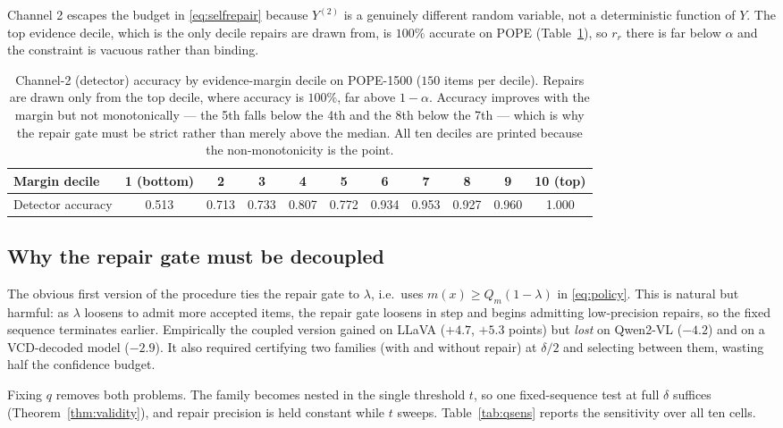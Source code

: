 \documentclass{article}
\theoremstyle{plain}
\theoremstyle{definition}
\theoremstyle{remark}
\begin{document}
Channel 2 escapes the budget in \eqref{eq:selfrepair} because $Y^{(2)}$ is a genuinely
different random variable, not a deterministic function of $Y$. The top evidence decile, which
is the only decile repairs are drawn from, is $100\%$ accurate on POPE
(Table~\ref{tab:channel2}), so $r_r$ there is far below $\alpha$ and the constraint is vacuous
rather than binding.

\begin{table}[t]
\centering
\caption{Channel-2 (detector) accuracy by evidence-margin decile on POPE-1500 ($150$ items per
decile). Repairs are drawn only from the top decile, where accuracy is $100\%$, far above
$1-\alpha$. Accuracy improves with the margin but not monotonically --- the 5th falls below the
4th and the 8th below the 7th --- which is why the repair gate must be strict rather than merely
above the median. All ten deciles are printed because the non-monotonicity is the point.}
\label{tab:channel2}
\small
\begin{tabular}{lcccccccccc}
\toprule
Margin decile & 1 (bottom) & 2 & 3 & 4 & 5 & 6 & 7 & 8 & 9 & 10 (top)\\
\midrule
Detector accuracy & 0.513 & 0.713 & 0.733 & 0.807 & 0.772 & 0.934 & 0.953 & 0.927 & 0.960 & 1.000\\
\bottomrule
\end{tabular}
\end{table}

\subsection{Why the repair gate must be decoupled}
\label{sec:decoupling}

The obvious first version of the procedure ties the repair gate to $\lambda$, i.e.\ uses
$m(x)\ge Q_m(1-\lambda)$ in \eqref{eq:policy}. This is natural but harmful: as $\lambda$
loosens to admit more accepted items, the repair gate loosens in step and begins admitting
low-precision repairs, so the fixed sequence terminates earlier. Empirically the coupled
version gained on LLaVA ($+4.7$, $+5.3$ points) but \emph{lost} on Qwen2-VL ($-4.2$) and on
a VCD-decoded model ($-2.9$). It also required certifying two families (with and without
repair) at $\delta/2$ and selecting between them, wasting half the confidence budget.

Fixing $q$ removes both problems. The family becomes nested in the single threshold
$t$, so one fixed-sequence test at full $\delta$ suffices (Theorem~\ref{thm:validity}), and
repair precision is held constant while $t$ sweeps. Table~\ref{tab:qsens} reports the
sensitivity over all ten cells.
\end{document}
